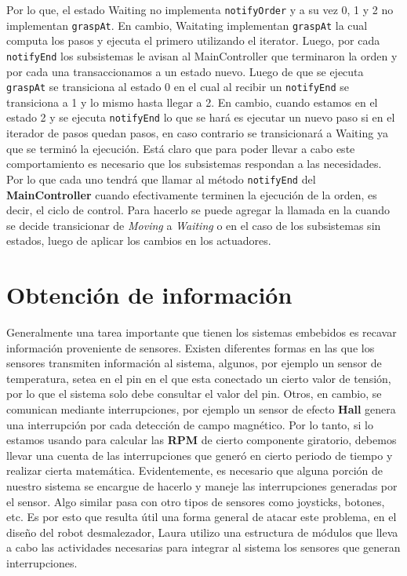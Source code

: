 Por lo que, el estado Waiting no implementa \verb|notifyOrder| y a su vez 0, 1 y 2 no implementan \verb|graspAt|. En cambio, Waitating implementan \verb|graspAt| la cual computa los pasos y ejecuta el primero utilizando el iterator. Luego, por cada \verb|notifyEnd| los subsistemas le avisan al MainController que terminaron la orden y por cada una transaccionamos a un estado nuevo. Luego de que se ejecuta \verb|graspAt| se transiciona al estado 0 en el cual al recibir un \verb|notifyEnd| se transiciona a 1 y lo mismo hasta llegar a 2. En cambio, cuando estamos en el estado 2 y se ejecuta \verb|notifyEnd| lo que se hará es ejecutar un nuevo paso si en el iterador de pasos quedan pasos, en caso contrario se transicionará a Waiting ya que se terminó la ejecución. Está claro que para poder llevar a cabo este comportamiento es necesario que los subsistemas respondan a las necesidades. Por lo que cada uno tendrá que llamar al método \verb|notifyEnd| del \textbf{MainController} cuando efectivamente terminen la ejecución de la orden, es decir, el ciclo de control. Para hacerlo se puede agregar la llamada en la cuando se decide transicionar de \textit{Moving} a \textit{Waiting }o en el caso de los subsistemas sin estados, luego de aplicar los cambios en los actuadores.

\newpage
\section{Obtención de información}
\label{obtInfo}

Generalmente una tarea importante que tienen los sistemas embebidos es recavar información proveniente de sensores. Existen diferentes formas en las que los sensores transmiten información al sistema, algunos, por ejemplo un sensor de temperatura, setea en el pin en el que esta conectado un cierto valor de tensión, por lo que el sistema solo debe consultar el valor del pin. Otros, en cambio, se comunican mediante interrupciones, por ejemplo un sensor de efecto \textbf{Hall} genera una interrupción por cada detección de campo magnético. Por lo tanto, si lo estamos usando para calcular las \textbf{RPM} de cierto componente giratorio, debemos llevar una cuenta de las interrupciones que generó en cierto periodo de tiempo y realizar cierta matemática. Evidentemente, es necesario que alguna porción de nuestro sistema se encargue de hacerlo y maneje las interrupciones generadas por el sensor. Algo similar pasa con otro tipos de sensores como joysticks, botones, etc. Es por esto que resulta útil una forma general de atacar este problema, en el diseño del robot desmalezador, Laura utilizo una estructura de módulos que lleva a cabo las actividades necesarias para integrar al sistema los sensores que generan interrupciones.


